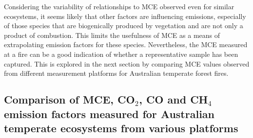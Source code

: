 \documentclass[acp, manuscript]{copernicus}
\begin{document}
Considering the variability of relationships to MCE observed even for similar ecosystems, it seems likely that other factors are influencing emissions, especially of those species that are biogenically produced by vegetation and are not only a product of combustion. This limits the usefulness of MCE as a means of extrapolating emission factors for these species. Nevertheless, the MCE measured at a fire can be a good indication of whether a representative sample has been captured. This is explored in the next section by comparing MCE values observed from different measurement platforms for Australian temperate forest fires. 

\subsection{Comparison of MCE, CO$_2$, CO and CH$_4$ emission factors measured for Australian temperate ecosystems from various platforms}
\end{document}
